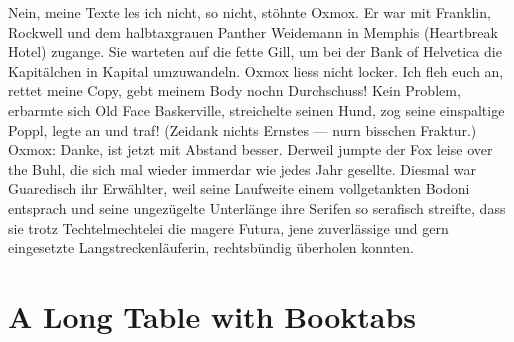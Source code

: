 Nein, meine Texte les ich nicht, so nicht, stöhnte Oxmox. Er war mit Franklin, Rockwell und dem halbtaxgrauen Panther Weidemann in Memphis (Heartbreak Hotel) zugange. Sie warteten auf die fette Gill, um bei der Bank of Helvetica die Kapitälchen in Kapital umzuwandeln. Oxmox liess nicht locker. Ich fleh euch an, rettet meine Copy, gebt meinem Body nochn Durchschuss! Kein Problem, erbarmte sich Old Face Baskerville, streichelte seinen Hund, zog seine einspaltige Poppl, legte an und traf! (Zeidank nichts Ernstes --- nurn bisschen Fraktur.) Oxmox: Danke, ist jetzt mit Abstand besser. Derweil jumpte der Fox leise over the Buhl, die sich mal wieder immerdar wie jedes Jahr gesellte. Diesmal war Guaredisch ihr Erwählter, weil seine Laufweite einem vollgetankten Bodoni entsprach und seine ungezügelte Unterlänge ihre Serifen so serafisch streifte, dass sie trotz Techtelmechtelei die magere Futura, jene zuverlässige und gern eingesetzte Langstreckenläuferin, rechtsbündig überholen konnten.


\section{A Long Table with Booktabs}


